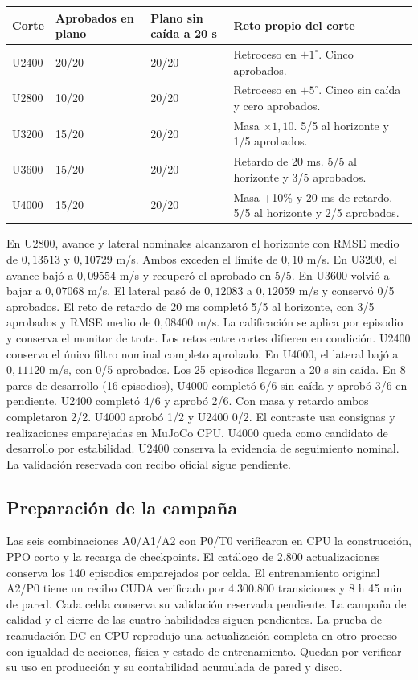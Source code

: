 \documentclass[11pt]{article}
\begin{document}
\begin{tabularx}{\linewidth}{@{}p{.14\linewidth}p{.18\linewidth}p{.20\linewidth}L@{}}
\toprule
\textbf{Corte} & \textbf{Aprobados en plano} & \textbf{Plano sin caída a 20 s} & \textbf{Reto propio del corte}\\
\midrule
U2400 & 20/20 & 20/20 & Retroceso en \(+1^\circ\). Cinco aprobados.\\
U2800 & 10/20 & 20/20 & Retroceso en \(+5^\circ\). Cinco sin caída y cero aprobados.\\
U3200 & 15/20 & 20/20 & Masa \(\times 1{,}10\). 5/5 al horizonte y 1/5 aprobados.\\
U3600 & 15/20 & 20/20 & Retardo de 20 ms. 5/5 al horizonte y 3/5 aprobados.\\
U4000 & 15/20 & 20/20 & Masa +10\% y 20 ms de retardo. 5/5 al horizonte y 2/5 aprobados.\\
\bottomrule
\end{tabularx}

En U2800, avance y lateral nominales alcanzaron el horizonte con RMSE medio de \(0{,}13513\) y \(0{,}10729\) m/s. Ambos exceden el límite de \(0{,}10\) m/s. En U3200, el avance bajó a \(0{,}09554\) m/s y recuperó el aprobado en 5/5. En U3600 volvió a bajar a \(0{,}07068\) m/s. El lateral pasó de \(0{,}12083\) a \(0{,}12059\) m/s y conservó 0/5 aprobados. El reto de retardo de 20 ms completó 5/5 al horizonte, con 3/5 aprobados y RMSE medio de \(0{,}08400\) m/s. La calificación se aplica por episodio y conserva el monitor de trote. Los retos entre cortes difieren en condición. U2400 conserva el único filtro nominal completo aprobado. En U4000, el lateral bajó a \(0{,}11120\) m/s, con 0/5 aprobados. Los 25 episodios llegaron a 20 s sin caída. En 8 pares de desarrollo (16 episodios), U4000 completó 6/6 sin caída y aprobó 3/6 en pendiente. U2400 completó 4/6 y aprobó 2/6. Con masa y retardo ambos completaron 2/2. U4000 aprobó 1/2 y U2400 0/2. El contraste usa consignas y realizaciones emparejadas en MuJoCo CPU. U4000 queda como candidato de desarrollo por estabilidad. U2400 conserva la evidencia de seguimiento nominal. La validación reservada con recibo oficial sigue pendiente.

\subsection*{Preparación de la campaña}
Las seis combinaciones A0/A1/A2 con P0/T0 verificaron en CPU la construcción, PPO corto y la recarga de checkpoints. El catálogo de 2.800 actualizaciones conserva los 140 episodios emparejados por celda. El entrenamiento original A2/P0 tiene un recibo CUDA verificado por 4.300.800 transiciones y 8 h 45 min de pared. Cada celda conserva su validación reservada pendiente. La campaña de calidad y el cierre de las cuatro habilidades siguen pendientes. La prueba de reanudación DC en CPU reprodujo una actualización completa en otro proceso con igualdad de acciones, física y estado de entrenamiento. Quedan por verificar su uso en producción y su contabilidad acumulada de pared y disco.
\end{document}

